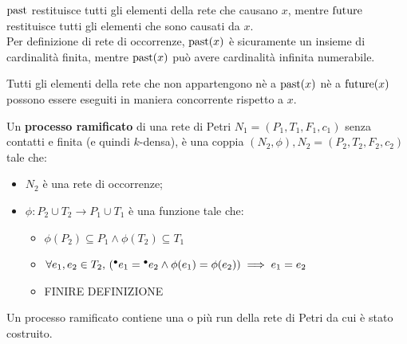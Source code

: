 $\textnormal{past}$ restituisce tutti gli elementi della rete che causano $x$, mentre
$\textnormal{future}$ restituisce tutti gli elementi che sono causati da $x$.\\
Per definizione di rete di occorrenze, $\textnormal{past}(x)$ è sicuramente un insieme
di cardinalità finita, mentre $\textnormal{past}(x)$ può avere cardinalità infinita
numerabile.

\begin{rem}
    Tutti gli elementi della rete che non appartengono nè a $\textnormal{past}(x)$ nè
    a $\textnormal{future}(x)$ possono essere eseguiti in maniera concorrente rispetto
    a $x$.
\end{rem}

\begin{defn}
    Un \textbf{processo ramificato} di una rete di Petri $N_1 = (P_1, T_1, F_1, c_1)$
    senza contatti e finita (e quindi $k$-densa), è una coppia
    $(N_2, \phi), N_2 = (P_2, T_2, F_2, c_2)$ tale che:
    \begin{itemize}
        \item $N_2$ è una rete di occorrenze;
        \item $\phi: P_2 \cup T_2 \rightarrow P_1 \cup T_1$ è una funzione
        tale che:
        \begin{itemize}
            \item $\phi(P_2) \subseteq P_1 \land \phi(T_2) \subseteq T_1$
            \item $\forall e_1, e_2 \in T_2, \, ({^\bullet}e_1 = {^\bullet}e_2
            \land \phi(e_1) = \phi(e_2)) \implies e_1 = e_2$
            \item FINIRE DEFINIZIONE
        \end{itemize}
    \end{itemize}
\end{defn}

\begin{rem}
    Un processo ramificato contiene una o più run della rete di Petri da cui
    è stato costruito.
\end{rem}


